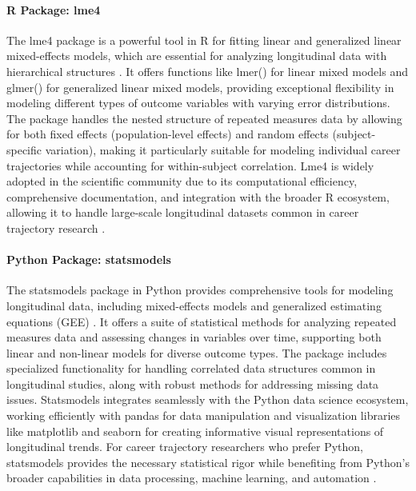 \documentclass[../main.tex]{subfiles}
\begin{document}

\paragraph{R Package: lme4}
The lme4 package is a powerful tool in R for fitting linear and generalized linear mixed-effects models, which are essential for analyzing longitudinal data with hierarchical structures \citep{lme4slides2011}. It offers functions like lmer() for linear mixed models and glmer() for generalized linear mixed models, providing exceptional flexibility in modeling different types of outcome variables with varying error distributions. The package handles the nested structure of repeated measures data by allowing for both fixed effects (population-level effects) and random effects (subject-specific variation), making it particularly suitable for modeling individual career trajectories while accounting for within-subject correlation. Lme4 is widely adopted in the scientific community due to its computational efficiency, comprehensive documentation, and integration with the broader R ecosystem, allowing it to handle large-scale longitudinal datasets common in career trajectory research \citep{lme4slides2011}.

\paragraph{Python Package: statsmodels}
The statsmodels package in Python provides comprehensive tools for modeling longitudinal data, including mixed-effects models and generalized estimating equations (GEE) \citep{statsmodels2024}. It offers a suite of statistical methods for analyzing repeated measures data and assessing changes in variables over time, supporting both linear and non-linear models for diverse outcome types. The package includes specialized functionality for handling correlated data structures common in longitudinal studies, along with robust methods for addressing missing data issues. Statsmodels integrates seamlessly with the Python data science ecosystem, working efficiently with pandas for data manipulation and visualization libraries like matplotlib and seaborn for creating informative visual representations of longitudinal trends. For career trajectory researchers who prefer Python, statsmodels provides the necessary statistical rigor while benefiting from Python's broader capabilities in data processing, machine learning, and automation \citep{statsmodels2024}.
\end{document}
